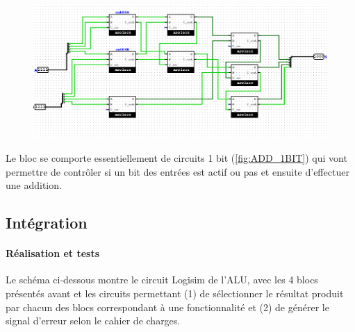 \documentclass[a4paper]{article}
\begin{document}
\begin{tcolorbox}[colframe=Monokaimagenta,colback=white]
\begin{figure}[H]
    \centering
    \includegraphics[width=\textwidth]{src/COMP_TEST_1111.png}
    \label{fig:CUSTOM}
\end{figure}



Le bloc se comporte essentiellement de circuits 1 bit (\ref{fig:ADD_1BIT}) qui vont permettre de contrôler si un bit des entrées est actif ou pas et ensuite d'effectuer une addition.

\end{tcolorbox}

\subsection{Intégration}
\paragraph{Réalisation et tests}
Le schéma ci-dessous montre le circuit Logisim de l’ALU, avec les 4 blocs présentés avant et les circuits permettant (1) de sélectionner le résultat produit par chacun des blocs correspondant à une fonctionnalité et (2) de générer le signal d’erreur selon le cahier de charges. 
\end{document}
